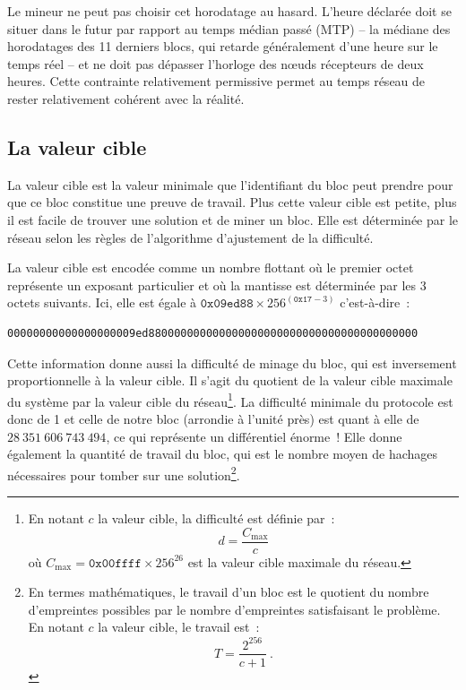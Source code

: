 \clearpage
Le mineur ne peut pas choisir cet horodatage au hasard. L'heure déclarée doit se situer dans le futur par rapport au temps médian passé (MTP) -- la médiane des horodatages des 11 derniers blocs, qui retarde généralement d'une heure sur le temps réel -- et ne doit pas dépasser l'horloge des nœuds récepteurs de deux heures. Cette contrainte relativement permissive permet au temps réseau de rester relativement cohérent avec la réalité.


\subsection{La valeur cible} La valeur cible est la valeur minimale que l'identifiant du bloc peut prendre pour que ce bloc constitue une preuve de travail. Plus cette valeur cible est petite, plus il est facile de trouver une solution et de miner un bloc. Elle est déterminée par le réseau selon les règles de l'algorithme d'ajustement de la difficulté.

La valeur cible est encodée comme un nombre flottant où le premier octet représente un exposant particulier et où la mantisse est déterminée par les 3 octets suivants. Ici, elle est égale à $\mathtt{0x09ed88} \times 256^{(\mathtt{0x17} - 3)}$ c'est-à-dire~:

\begin{Verbatim}[fontsize=\footnotesize]
00000000000000000009ed880000000000000000000000000000000000000000
\end{Verbatim}

Cette information donne aussi la difficulté de minage du bloc, qui est inversement proportionnelle à la valeur cible. Il s'agit du quotient de la valeur cible maximale du système par la valeur cible du réseau\footnote{En notant $c$ la valeur cible, la difficulté est définie par~: \[ d = \frac{C_{\mathrm{max}}}{c} \] où $C_{\mathrm{max}} = \mathtt{0x00ffff} \times 256^{26}$ est la valeur cible maximale du réseau.}. La difficulté minimale du protocole est donc de 1 et celle de notre bloc (arrondie à l'unité près) est quant à elle de $28~351~606~743~494$, ce qui représente un différentiel énorme~! Elle donne également la quantité de travail du bloc, qui est le nombre moyen de hachages nécessaires pour tomber sur une solution\footnote{En termes mathématiques, le travail d'un bloc est le quotient du nombre d'empreintes possibles par le nombre d'empreintes satisfaisant le problème. En notant $c$ la valeur cible, le travail est~: \[ T = \frac{2^{256}}{c + 1} ~.\]}.

